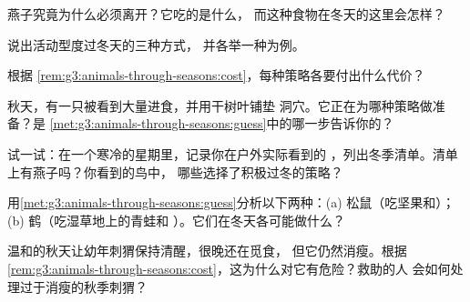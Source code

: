 \begin{exercise}[$\star$]\label{exo:g3:animals-through-seasons:4}
燕子究竟为什么必须离开？它吃的是什么，
而这种食物在冬天的这里会怎样？
\end{exercise}

\begin{exercise}[$\star$]\label{exo:g3:animals-through-seasons:5}
说出活动型度过冬天的三种方式，
并各举一种为例。
\end{exercise}

\begin{exercise}[$\star$]\label{exo:g3:animals-through-seasons:6}
根据
\cref{rem:g3:animals-through-seasons:cost}，每种策略各要付出什么代价？
\end{exercise}

\begin{exercise}[$\star$]\label{exo:g3:animals-through-seasons:7}
秋天，有一只被看到大量进食，并用干树叶铺垫
洞穴。它正在为哪种策略做准备？是
\cref{met:g3:animals-through-seasons:guess}中的哪一步告诉你的？
\end{exercise}

\begin{exercise}[$\star$]\label{exo:g3:animals-through-seasons:8}
试一试：在一个寒冷的星期里，记录你在户外实际看到的
，列出冬季清单。清单上有燕子吗？你看到的鸟中，
哪些选择了积极过冬的策略？
\end{exercise}

\begin{exercise}[$\star\star$]\label{exo:g3:animals-through-seasons:9}
用\cref{met:g3:animals-through-seasons:guess}分析以下两种：(a)
松鼠（吃坚果和）；(b) 鹤（吃湿草地上的青蛙和
）。它们在冬天各可能做什么？
\end{exercise}

\begin{exercise}[$\star\star$]\label{exo:g3:animals-through-seasons:10}
温和的秋天让幼年刺猬保持清醒，很晚还在觅食，
但它仍然消瘦。根据
\cref{rem:g3:animals-through-seasons:cost}，这为什么对它有危险？救助的人
会如何处理过于消瘦的秋季刺猬？
\end{exercise}
